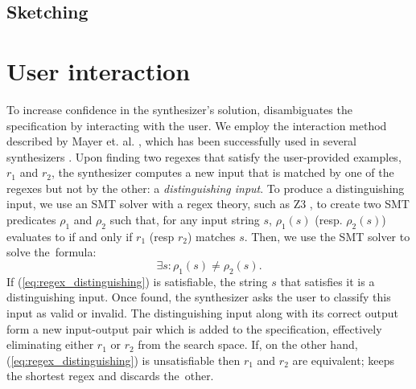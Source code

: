 \subsection{Sketching}


\section{User interaction}\label{sec:interaction}
To increase confidence in the synthesizer's solution, \Forest{} disambiguates the specification by interacting with the user. %
We employ the interaction method described by Mayer et. al. \cite{DBLP:conf/uist/MayerSGLMPSZG15}, which has been successfully used in several synthesizers  \cite{DBLP:journals/pvldb/LiCM15,DBLP:conf/sigmod/WangCB17,DBLP:conf/pldi/WangCB17}.
Upon finding two regexes that satisfy the user-provided examples, \(r_1\) and \(r_2\), the synthesizer computes a new input that is matched by one of the regexes but not by the other: a \textit{distinguishing input}.     
To produce a distinguishing input, we use an \ac{SMT} solver with a regex theory, such as Z3 \cite{z3,z3str317}, to create two \ac{SMT} predicates \(\rho_{1}\) and \(\rho_{2}\) such that, for any input string \(s\), \(\rho_{1}(s)\) (resp. \(\rho_{2}(s)\)) evaluates to \true{} if and only if \(r_1\) (resp \(r_2\)) matches \(s\).
%
%
Then, we use the \ac{SMT} solver to solve the~formula:
%
\begin{equation}\label{eq:regex_distinguishing}
  \exists s: \rho_{1}(s) \neq \rho_{2}(s).
\end{equation}
%
If (\ref{eq:regex_distinguishing}) is satisfiable, the string \(s\) that satisfies it is a distinguishing input. Once found, the synthesizer asks the user to classify this input as valid or invalid.
The distinguishing input along with its correct output form a new input-output pair which is added to the specification, effectively eliminating either \(r_1\) or \(r_2\) from the search space.
If, on the other hand, (\ref{eq:regex_distinguishing}) is unsatisfiable then \(r_1\) and \(r_2\) are equivalent; \Forest{} keeps the shortest regex and discards the~other.

